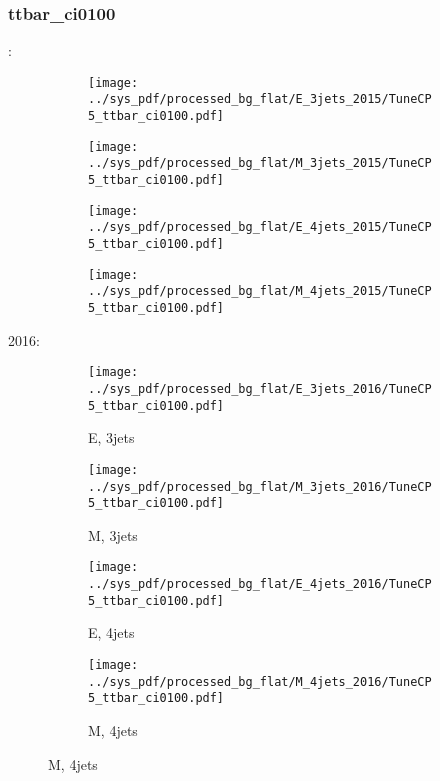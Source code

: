 \documentclass{beamer}
\begin{document}
\begin{frame}
\frametitle{ttbar_ci0100}
\fontsize{5}{1}:
\begin{figure}
\centering
\begin{subfigure}[b]{0.24\textwidth}
\texttt{[image: ../sys\_pdf/processed\_bg\_flat/E\_3jets\_2015/TuneCP5\_ttbar\_ci0100.pdf]}
\end{subfigure}
\begin{subfigure}[b]{0.24\textwidth}
\texttt{[image: ../sys\_pdf/processed\_bg\_flat/M\_3jets\_2015/TuneCP5\_ttbar\_ci0100.pdf]}
\end{subfigure}
\begin{subfigure}[b]{0.24\textwidth}
\texttt{[image: ../sys\_pdf/processed\_bg\_flat/E\_4jets\_2015/TuneCP5\_ttbar\_ci0100.pdf]}
\end{subfigure}
\begin{subfigure}[b]{0.24\textwidth}
\texttt{[image: ../sys\_pdf/processed\_bg\_flat/M\_4jets\_2015/TuneCP5\_ttbar\_ci0100.pdf]}
\end{subfigure}
\end{figure}
2016:
\begin{figure}
\centering
\begin{subfigure}[b]{0.24\textwidth}
\texttt{[image: ../sys\_pdf/processed\_bg\_flat/E\_3jets\_2016/TuneCP5\_ttbar\_ci0100.pdf]}
\captionsetup{font=tiny}
\caption{E, 3jets}
\end{subfigure}
\begin{subfigure}[b]{0.24\textwidth}
\texttt{[image: ../sys\_pdf/processed\_bg\_flat/M\_3jets\_2016/TuneCP5\_ttbar\_ci0100.pdf]}
\captionsetup{font=tiny}
\caption{M, 3jets}
\end{subfigure}
\begin{subfigure}[b]{0.24\textwidth}
\texttt{[image: ../sys\_pdf/processed\_bg\_flat/E\_4jets\_2016/TuneCP5\_ttbar\_ci0100.pdf]}
\captionsetup{font=tiny}
\caption{E, 4jets}
\end{subfigure}
\begin{subfigure}[b]{0.24\textwidth}
\texttt{[image: ../sys\_pdf/processed\_bg\_flat/M\_4jets\_2016/TuneCP5\_ttbar\_ci0100.pdf]}
\captionsetup{font=tiny}
\caption{M, 4jets}
\end{subfigure}
\end{figure}
\end{frame}
\end{document}
